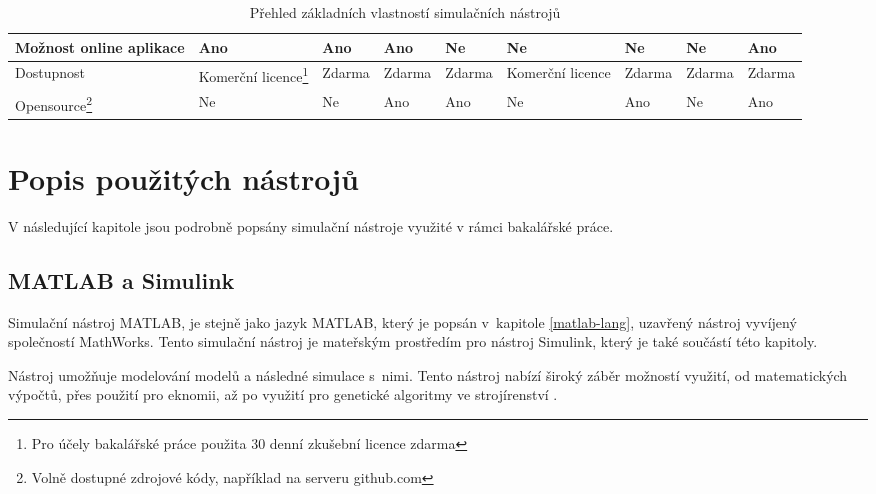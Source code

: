 \begin{savenotes}
\begin{table}[]
{\begin{tabular}{|l|l|l|l|l|l|l|l|l|}
Možnost online aplikace                                                                                     & Ano                                                                                                             & Ano        & Ano    & Ne      & Ne               & Ne                                                       & Ne        & Ano            \\ \hline
Dostupnost                                                                                          & Komerční licence\footnote{Pro účely bakalářské práce použita 30 denní zkušební licence zdarma} & Zdarma     & Zdarma & Zdarma  & Komerční licence & Zdarma                                                   & Zdarma    & Zdarma         \\ \hline
Opensource\footnote{Volně dostupné zdrojové kódy, například na serveru github.com} & Ne                                                                                                              & Ne         & Ano    & Ano     & Ne               & Ano                                                      & Ne        & Ano            \\ \hline
\end{tabular}%
}
\caption{Přehled základních vlastností simulačních nástrojů}
\label{tab:rozdeleni-nastroju}
\end{table}
\end{savenotes}



\section{Popis použitých nástrojů}
\label{popis-nastroju}
V následující kapitole jsou podrobně popsány simulační nástroje využité v rámci bakalářské práce. 
\subsection{MATLAB a Simulink}
\label{matlab-desc}

Simulační nástroj MATLAB, je stejně jako jazyk MATLAB, který je popsán v~kapitole \ref{matlab-lang}, uzavřený nástroj vyvíjený společností MathWorks. Tento simulační nástroj je mateřským prostředím pro nástroj Simulink, který je také součástí této kapitoly.

Nástroj umožňuje modelování modelů a následné simulace s~nimi. Tento nástroj nabízí široký záběr možností využití, od matematických výpočtů, přes použití pro eknomii, až po využití pro genetické algoritmy ve strojírenství \cite{Zapletal2016}.

